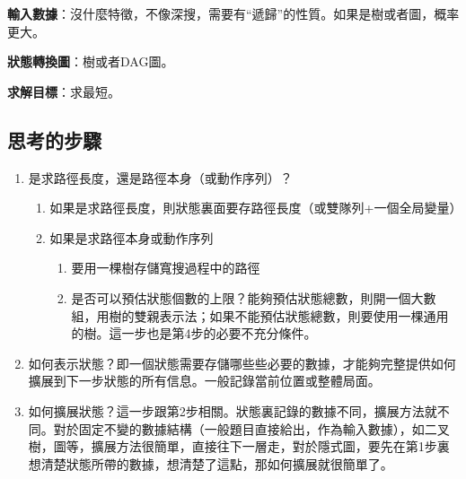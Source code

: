 \textbf{輸入數據}：沒什麼特徵，不像深搜，需要有“遞歸”的性質。如果是樹或者圖，概率更大。

\textbf{狀態轉換圖}：樹或者DAG圖。

\textbf{求解目標}：求最短。


\subsection{思考的步驟}
\begin{enumerate}
\item 是求路徑長度，還是路徑本身（或動作序列）？
    \begin{enumerate}
    \item 如果是求路徑長度，則狀態裏面要存路徑長度（或雙隊列+一個全局變量）
    \item 如果是求路徑本身或動作序列
        \begin{enumerate}
            \item 要用一棵樹存儲寬搜過程中的路徑
            \item 是否可以預估狀態個數的上限？能夠預估狀態總數，則開一個大數組，用樹的雙親表示法；如果不能預估狀態總數，則要使用一棵通用的樹。這一步也是第4步的必要不充分條件。
        \end{enumerate}
    \end{enumerate}

\item 如何表示狀態？即一個狀態需要存儲哪些些必要的數據，才能夠完整提供如何擴展到下一步狀態的所有信息。一般記錄當前位置或整體局面。

\item 如何擴展狀態？這一步跟第2步相關。狀態裏記錄的數據不同，擴展方法就不同。對於固定不變的數據結構（一般題目直接給出，作為輸入數據），如二叉樹，圖等，擴展方法很簡單，直接往下一層走，對於隱式圖，要先在第1步裏想清楚狀態所帶的數據，想清楚了這點，那如何擴展就很簡單了。


\end{enumerate}
